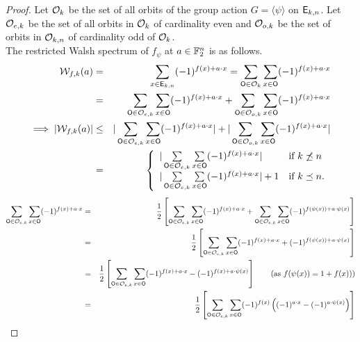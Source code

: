 \documentclass{llncs}
\begin{document}
\begin{proof}
Let $\mathcal{O}_k$ be the set of all orbits of the group action $G = \langle \psi \rangle$ on $\mathsf{E}_{k,n}$.
Let $\mathcal{O}_{e,k}$ be the set of all orbits in $\mathcal{O}_k$ of cardinality even and $\mathcal{O}_{o,k}$ be the set of orbits in $\mathcal{O}_{k,n}$ of cardinality odd of $\mathcal{O}_k$. \\
The restricted Walsh spectrum of $f_\psi$ at $a \in \mathbb{F}_2^n$ is as follows.
\begin{eqnarray} \label{eqn:ws_k}
\mathcal{W}_{f,k}(a) & =  & \sum_{x \in \mathsf{E}_{k,n}} (-1)^{f(x)+a \cdot x} 
= \sum_{\mathsf{O} \in \mathcal{O}_k} \sum_{x \in \mathsf{O}} (-1)^{f(x)+ a \cdot x} \nonumber \\ 
& = &\sum_{\mathsf{O} \in \mathcal{O}_{e,k}} \sum_{x \in \mathsf{O}} (-1)^{ f(x) + a \cdot x} + \sum_{\mathsf{O} \in \mathcal{O}_{o,k}} \sum_{x \in \mathsf{O}} (-1)^{ f(x) + a \cdot x} \nonumber \\
\implies |\mathcal{W}_{f,k}(a)| & \leq  & |\sum_{\mathsf{O} \in \mathcal{O}_{e,k}} \sum_{x \in \mathsf{O}} (-1)^{ f(x) + a \cdot x}| + | \sum_{\mathsf{O} \in \mathcal{O}_{o,k}} \sum_{x \in \mathsf{O}} (-1)^{ f(x) + a \cdot x}| \nonumber\\
& = & \left\{\begin{array}{ll}
    |\sum\limits_{\mathsf{O} \in \mathcal{O}_{e,k}} \sum\limits_{x \in \mathsf{O}} (-1)^{ f(x) + a \cdot x}| & \text{if } k \not\preceq n\\
    |\sum\limits_{\mathsf{O} \in \mathcal{O}_{e,k}} \sum\limits_{x \in \mathsf{O}} (-1)^{ f(x) + a \cdot x}| + 1 & \text{if } k \preceq n.
    \end{array}\right.
\end{eqnarray}
\begin{eqnarray*}\label{eqn:wse_k}
\sum_{\orb \in \orbs_{e,k}} \sum_{x \in \orb} (-1)^{ f(x) + a \cdot x} & = &
\frac{1}{2} \left[ \sum_{\orb \in \orbs_{e,k}} \sum_{x \in \orb} (-1)^{ f(x) + a \cdot x} + \sum_{\orb \in \orbs_{e,k}} \sum_{x \in \orb} (-1)^{ f(\psi(x)) + a \cdot \psi(x)} \right]  \nonumber \\
& = & \frac{1}{2} \left[ \sum_{\orb \in \orbs_{e,k}} \sum_{x \in \orb} (-1)^{ f(x) + a \cdot x} + (-1)^{f(\psi(x))+ a \cdot \psi(x)}   \right]  \nonumber \\
& = & \frac{1}{2}  \left[ \sum_{\orb \in \orbs_{e,k}} \sum_{x \in \orb} (-1)^{ f(x) + a \cdot x} - (-1)^{f(x) + a \cdot \psi(x)}   \right] ~~~~~~(\text{as }f(\psi(x)) = 1+f(x)))   \nonumber \\
& = & \frac{1}{2} \left[ \sum_{\orb \in \orbs_{e,k}} \sum_{x \in \orb} (-1)^{ f(x)} \left((-1)^{a \cdot x} - (-1)^{ a \cdot \psi(x)}\right) \right] \nonumber \\

\end{eqnarray*}
\end{proof}
\end{document}
